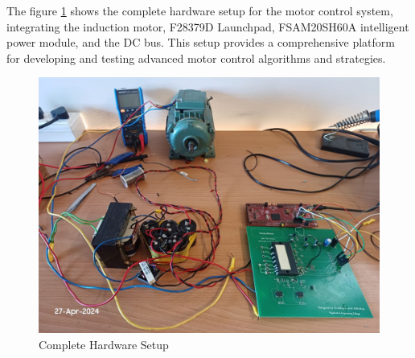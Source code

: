 
The figure \ref{fig:Complete Hardware Setup} shows the complete hardware setup for the motor control system, integrating the induction motor, F28379D Launchpad, FSAM20SH60A intelligent power module, and the DC bus. This setup provides a comprehensive platform for developing and testing advanced motor control algorithms and strategies.

\begin{figure}
	\centering
	\includegraphics[width=6in]{sections/section6/images/hardwareSetup/fullSetupWithMotorAndIPM.jpg}
	\caption{Complete Hardware Setup}
	\label{fig:Complete Hardware Setup}
\end{figure}
\newpage